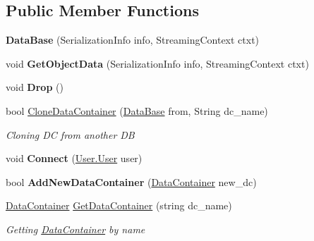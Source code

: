 \subsection*{Public Member Functions}
\begin{DoxyCompactItemize}
\item 
\hypertarget{class_dwarf_d_b_1_1_data_structures_1_1_data_base_a9748f9609030f61d1cfc28a162a48ad5}{{\bfseries Data\+Base} (Serialization\+Info info, Streaming\+Context ctxt)}\label{class_dwarf_d_b_1_1_data_structures_1_1_data_base_a9748f9609030f61d1cfc28a162a48ad5}

\item 
\hypertarget{class_dwarf_d_b_1_1_data_structures_1_1_data_base_a34980ba6f61e15d6dcbe5af7f596a6fd}{void {\bfseries Get\+Object\+Data} (Serialization\+Info info, Streaming\+Context ctxt)}\label{class_dwarf_d_b_1_1_data_structures_1_1_data_base_a34980ba6f61e15d6dcbe5af7f596a6fd}

\item 
\hypertarget{class_dwarf_d_b_1_1_data_structures_1_1_data_base_ae169105e97a66c5d621b3d945d11fce4}{void {\bfseries Drop} ()}\label{class_dwarf_d_b_1_1_data_structures_1_1_data_base_ae169105e97a66c5d621b3d945d11fce4}

\item 
bool \hyperlink{class_dwarf_d_b_1_1_data_structures_1_1_data_base_af1cedf55fdab7efe9154ea7570c9abc9}{Clone\+Data\+Container} (\hyperlink{class_dwarf_d_b_1_1_data_structures_1_1_data_base}{Data\+Base} from, String dc\+\_\+name)
\begin{DoxyCompactList}\small\item\em Cloning D\+C from another D\+B \end{DoxyCompactList}\item 
\hypertarget{class_dwarf_d_b_1_1_data_structures_1_1_data_base_ae0180400ee59265e19a5d981f59ca440}{void {\bfseries Connect} (\hyperlink{class_dwarf_d_b_1_1_user_1_1_user}{User.\+User} user)}\label{class_dwarf_d_b_1_1_data_structures_1_1_data_base_ae0180400ee59265e19a5d981f59ca440}

\item 
\hypertarget{class_dwarf_d_b_1_1_data_structures_1_1_data_base_a251d5fa0ba9b21d911a9a1c5dcf33152}{bool {\bfseries Add\+New\+Data\+Container} (\hyperlink{class_dwarf_d_b_1_1_data_structures_1_1_data_container}{Data\+Container} new\+\_\+dc)}\label{class_dwarf_d_b_1_1_data_structures_1_1_data_base_a251d5fa0ba9b21d911a9a1c5dcf33152}

\item 
\hyperlink{class_dwarf_d_b_1_1_data_structures_1_1_data_container}{Data\+Container} \hyperlink{class_dwarf_d_b_1_1_data_structures_1_1_data_base_aa554e79937460eb937b90d81093019b5}{Get\+Data\+Container} (string dc\+\_\+name)
\begin{DoxyCompactList}\small\item\em Getting \hyperlink{class_dwarf_d_b_1_1_data_structures_1_1_data_container}{Data\+Container} by name \end{DoxyCompactList}\end{DoxyCompactItemize}
